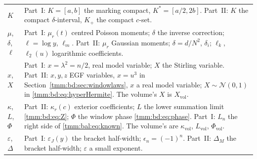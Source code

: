 \documentclass[11pt,letterpaper]{article}
\theoremstyle{remark}\newtheorem{remark}[theorem]{Remark}
\newcommand{\Normal}{\mathcal N}
\newcommand{\vol}{\mathrm{vol}}
\begin{document}
\begin{longtable}{@{}>{\raggedright\arraybackslash}p{} >{\raggedright\arraybackslash}p{}@{}}
$K$ & Part~I: $K=[a,b]$ the marking compact, $K^*=[a/2,2b]$. Part~II: $K$ the compact $\delta$-interval, $K_+$ the compact $c$-set.\\
$\mu$, $\delta$, $\ell$ & Part~I: $\mu_r(t)$ centred Poisson moments; $\delta$ the inverse correction; $\ell=\log y$, $\ell_m$. Part~II: $\mu_r$ Gaussian moments; $\delta=d/N^2$, $\delta_i$; $\ell_k$, $\ell_2(u)$ logarithmic coefficients.\\
$x$, $X$ & Part~I: $x=\lambda^2=n/2$, real model variable; $X$ the Stirling variable. Part~II: $x,y,z$ EGF variables, $x=u^3$ in Section~\ref{tmm:bd:sec:windowlaws}, $x$ a real model variable; $X\sim\Normal(0,1)$ in \eqref{tmm:bd:eq:hyperHermite}. The volume's $X$ is $X_\vol$.\\
$\kappa$, $L$, $\Phi$ & Part~II: $\kappa_r(c)$ exterior coefficients; $L$ the lower summation limit \eqref{tmm:bd:eq:Z}; $\Phi$ the window phase \eqref{tmm:bd:eq:phase}. Part~I: $L_n$ the right side of \eqref{tmm:bal:eq:known}. The volume's are $\kappa_\vol$, $L_\vol$, $\Phi_\vol$.\\
$\varepsilon$, $\Delta$ & Part~I: $\varepsilon_J(y)$ the bracket half-width; $\epsilon_n=(-1)^n$. Part~II: $\Delta_M$ the bracket half-width; $\varepsilon$ a small exponent.\\
\bottomrule
\end{longtable}
\addtocounter{table}{-1}%
\endgroup
\end{document}
